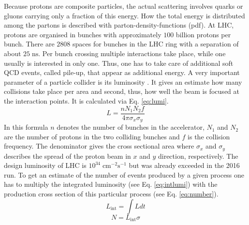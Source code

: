	Because protons are composite particles, the actual scattering involves quarks or gluons carrying only a fraction of this energy. How the total energy is distributed among the partons is described with parton-density-functions (pdf). At LHC, protons are organised in bunches with approximately $100$ billion protons per bunch. There are $2808$ spaces for bunches in the LHC ring with a separation of about $25\;\text{ns}$. Per bunch crossing multiple interactions take place, while one usually is interested in only one. Thus, one has to take care of additional soft QCD events, called pile-up, that appear as additional energy. A very important parameter of a particle collider is its luminosity \cite{luminosity}. It gives an estimate how many collisions take place per area and second, thus, how well the beam is focused at the interaction points. It is calculated via Eq. \ref{eq:lumi}. 
	\begin{equation}
	L = \frac{n N_1 N_2 f}{4 \pi \sigma_x \sigma_y}
	\label{eq:lumi}
	\end{equation} 
	In this formula $n$ denotes the number of bunches in the accelerator, $N_1$ and $N_2$ are the number of protons in the two colliding bunches and $f$ is the collision frequency. The denominator gives the cross sectional area where $\sigma_x$ and $\sigma_y$ describes the spread of the proton beam in $x$ and $y$ direction, respectively. The design luminosity of LHC is $10^{34}\;\text{cm}^{-2}\text{s}^{-1}$ but was already exceeded in the 2016 run. To get an estimate of the number of events produced by a given process one has to multiply the integrated luminosity (see Eq. \ref{eq:intlumi}) with the production cross section of this particular process (see Eq. \ref{eq:number}).
	\begin{equation}
	L_\text{int} = \int L dt
	\label{eq:intlumi}
	\end{equation} 
	\begin{equation}
	N = L_\text{int} \sigma
	\label{eq:number}
	\end{equation} 

